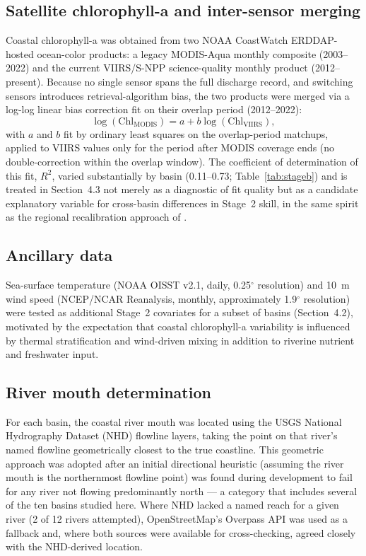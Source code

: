 \documentclass[preprint,12pt]{elsarticle}
\begin{document}
\subsection{Satellite chlorophyll-a and inter-sensor merging}
Coastal chlorophyll-a was obtained from two NOAA CoastWatch ERDDAP-hosted ocean-color products: a legacy MODIS-Aqua monthly composite (2003--2022) and the current VIIRS/S-NPP science-quality monthly product (2012--present). Because no single sensor spans the full discharge record, and switching sensors introduces retrieval-algorithm bias, the two products were merged via a log-log linear bias correction fit on their overlap period (2012--2022):
\begin{equation}
\log(\mathrm{Chl}_{\mathrm{MODIS}}) = a + b \log(\mathrm{Chl}_{\mathrm{VIIRS}}),
\label{eq:biascorrection}
\end{equation}
with $a$ and $b$ fit by ordinary least squares on the overlap-period matchups, applied to VIIRS values only for the period after MODIS coverage ends (no double-correction within the overlap window). The coefficient of determination of this fit, $R^2$, varied substantially by basin (0.11--0.73; Table~\ref{tab:stageb}) and is treated in Section~4.3 not merely as a diagnostic of fit quality but as a candidate explanatory variable for cross-basin differences in Stage~2 skill, in the same spirit as the regional recalibration approach of \citet{holbach2025chlorophyll}.

\subsection{Ancillary data}
Sea-surface temperature (NOAA OISST v2.1, daily, 0.25$^{\circ}$ resolution) and 10~m wind speed (NCEP/NCAR Reanalysis, monthly, approximately 1.9$^{\circ}$ resolution) were tested as additional Stage~2 covariates for a subset of basins (Section~4.2), motivated by the expectation that coastal chlorophyll-a variability is influenced by thermal stratification and wind-driven mixing in addition to riverine nutrient and freshwater input.

\subsection{River mouth determination}
For each basin, the coastal river mouth was located using the USGS National Hydrography Dataset (NHD) flowline layers, taking the point on that river's named flowline geometrically closest to the true coastline. This geometric approach was adopted after an initial directional heuristic (assuming the river mouth is the northernmost flowline point) was found during development to fail for any river not flowing predominantly north --- a category that includes several of the ten basins studied here. Where NHD lacked a named reach for a given river (2 of 12 rivers attempted), OpenStreetMap's Overpass API was used as a fallback and, where both sources were available for cross-checking, agreed closely with the NHD-derived location.
\end{document}
